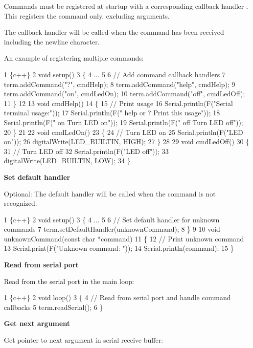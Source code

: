 Commands must be registered at startup with a corresponding {\ttfamily callback handler} . This registers the command only, excluding arguments.

The callback handler will be called when the command has been received including the newline character.

An example of registering multiple commands\+:


\begin{DoxyCode}
1 \{c++\}
2 void setup()
3 \{
4     ...
5 
6     // Add command callback handlers
7     term.addCommand("?", cmdHelp);
8     term.addCommand("help", cmdHelp);
9     term.addCommand("on", cmdLedOn);
10     term.addCommand("off", cmdLedOff);
11 \}
12 
13 void cmdHelp()
14 \{
15     // Print usage
16     Serial.println(F("Serial terminal usage:"));
17     Serial.println(F("  help or ?          Print this usage"));
18     Serial.println(F("  on                 Turn LED on"));
19     Serial.println(F("  off                Turn LED off"));
20 \}
21 
22 void cmdLedOn()
23 \{
24     // Turn LED on
25     Serial.println(F("LED on"));
26     digitalWrite(LED\_BUILTIN, HIGH);
27 \}
28 
29 void cmdLedOff()
30 \{
31     // Turn LED off
32     Serial.println(F("LED off"));
33     digitalWrite(LED\_BUILTIN, LOW);
34 \}
\end{DoxyCode}


{\bfseries Set default handler}

Optional\+: The default handler will be called when the command is not recognized.


\begin{DoxyCode}
1 \{c++\}
2 void setup()
3 \{   
4     ...
5 
6     // Set default handler for unknown commands
7     term.setDefaultHandler(unknownCommand);
8 \}
9 
10 void unknownCommand(const char *command)
11 \{
12     // Print unknown command
13     Serial.print(F("Unknown command: "));
14     Serial.println(command);
15 \}
\end{DoxyCode}


{\bfseries Read from serial port}

Read from the serial port in the main loop\+:


\begin{DoxyCode}
1 \{c++\}
2 void loop()
3 \{
4     // Read from serial port and handle command callbacks
5     term.readSerial();
6 \}
\end{DoxyCode}


{\bfseries Get next argument}

Get pointer to next argument in serial receive buffer\+:


